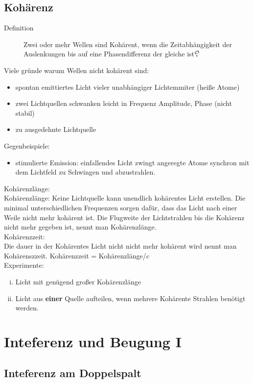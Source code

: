 \documentclass[titlepage,11pt,a4paper,ngerman]{report}
\newcommand{\lcom}[1]{\color{MidnightBlue}#1\color{black}}
\newcommand{\mau}{$\buildrel \mathcal{O} \over{\textbf{.}}$}
\begin{document}
\subsection{Kohärenz}
\begin{description}
	\item[Definition] Zwei oder mehr Wellen sind Kohärent, wenn die Zeitabhängigkeit der Auslenkungen bis auf eine Phasendifferenz der gleiche ist\mau
\end{description}
Viele gründe warum Wellen nicht kohärent sind:
\begin{itemize}
	\item spontan emittiertes Licht vieler unabhängiger Lichtemmiter (heiße Atome)
	\item zwei Lichtquellen schwanken leicht in Frequenz Amplitude, Phase (nicht stabil)
	\item zu ausgedehnte Lichtquelle
\end{itemize}
Gegenbeispiele:
\begin{itemize}
	\item stimulierte Emission: einfallendes Licht zwingt angeregte Atome synchron mit dem Lichtfeld zu Schwingen und abzustrahlen.
\end{itemize}
Kohärenzlänge:\\
\lcom{Kohärenzlänge: Keine Lichtquelle kann unendlich kohärentes Licht erstellen. Die minimal unterschiedlichen Frequenzen sorgen dafür, dass das Licht nach einer Weile nicht mehr kohärent ist. Die Flugweite der Lichtstrahlen bis die Kohärenz nicht mehr gegeben ist, nennt man Kohärenzlänge.}\\
Kohärenzzeit:\\
\lcom{Die dauer in der Kohärentes Licht nicht nicht mehr kohärent wird nennt man Kohärenszzeit. }
Kohärenzzeit = Kohärenzlänge/$c$\\
Experimente: 
\begin{enumerate}[(i)]
	\item Licht mit genügend großer Kohärenzlänge
	\item Licht aus \textbf{einer} Quelle aufteilen, wenn mehrere Kohärente Strahlen benötigt werden.
\end{enumerate}



\section{Inteferenz und Beugung I}
\subsection{Inteferenz am Doppelspalt}
\end{document}
